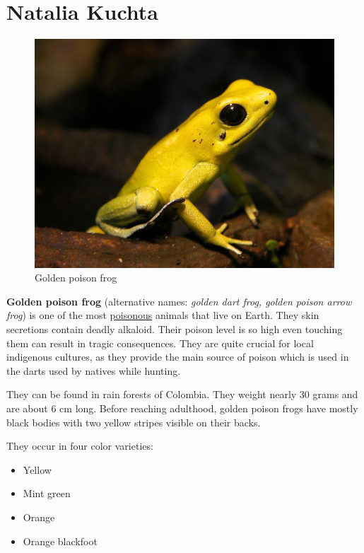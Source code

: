 \section{Natalia Kuchta}

\begin{figure}[h]
    \centering
    \includegraphics{pictures/zaba.jpg}
    \caption{Golden poison frog}
    \label{fig:frog}
\end{figure}
\begin{flushleft}
    \textbf{Golden poison frog} (alternative names: \textit{golden dart frog, golden poison arrow frog}) is one of the most \underline{poisonous} animals that live on Earth. They skin secretions contain deadly alkaloid. Their poison level is so high even touching them can result in tragic consequences. They are quite crucial for local indigenous cultures, as they provide the main source of poison which is used in the darts used by natives while hunting. 

They can be found in rain forests of Colombia. They weight nearly 30 grams and are about 6 cm long. Before reaching adulthood, golden poison frogs have mostly black bodies with two yellow stripes visible on their backs.    
\end{flushleft}
They occur in four color varieties:
\begin{itemize}
    \item Yellow
    \item Mint green
    \item Orange
    \item Orange blackfoot
\end{itemize}

